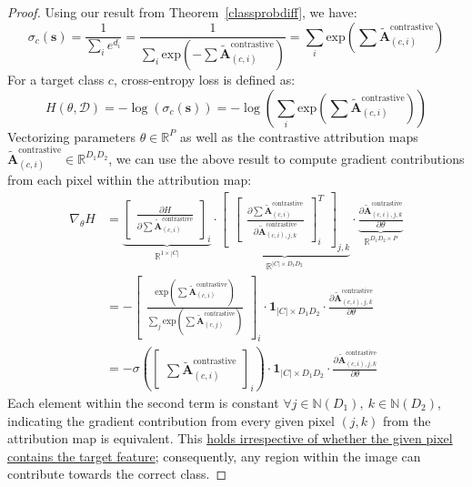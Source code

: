 \documentclass{article}
\theoremstyle{plain}
\theoremstyle{definition}
\theoremstyle{remark}
\newcommand{\contcam}[2]{\tilde{\mathcal{\bm{A}}}^{\text{contrastive}}_{(#1, #2)}}
\begin{document}
\begin{proof}
	Using our result from Theorem~\ref{classprobdiff}, we have:
	\begin{equation}
		\sigma_c(\bm{s}) = \frac{1}{\sum_i e^{d_i}} = \frac{1}{\sum_i \text{exp}({-\sum \contcam{c}{i}})} = \sum_i \text{exp}\left({\sum \contcam{c}{i}}\right)
	\end{equation}
	For a target class $c$, cross-entropy loss is defined as:
	\begin{equation}
		H(\theta, \mathcal{D}) = -\log \left( \sigma_c(\bm{s}) \right) = -\log \left( \sum_i \text{exp}\left({\sum \contcam{c}{i}}\right) \right)
	\end{equation}
	Vectorizing parameters $\theta \in \mathbb{R}^P$ as well as the contrastive attribution maps $\tilde{\mathcal{\bm{A}}}_{(c, i)}^{\text{contrastive}} \in \mathbb{R}^{D_1 D_2}$, we can use the above result to compute gradient contributions from each pixel within the attribution map:
	\begin{align}
		\nabla_\theta H &= \underbrace{\begin{bmatrix} \frac{\partial H}{\partial \sum \tilde{\mathcal{\bm{A}}}_{(c, i)}^{\text{contrastive}}} \end{bmatrix}_i}_{\mathbb{R}^{1 \times |C|}}
			\cdot \underbrace{\begin{bmatrix} \begin{bmatrix} \frac{\partial \sum \tilde{\mathcal{\bm{A}}}_{(c, i)}^{\text{contrastive}}}{\partial \tilde{\mathcal{\bm{A}}}_{(c, i), j, k}^{\text{contrastive}}} \end{bmatrix}_{i}^T \end{bmatrix}_{j,k}}_{\mathbb{R}^{|C| \times D_1 D_2}}
			\cdot \underbrace{\frac{\partial \tilde{\mathcal{\bm{A}}}_{(c, i), j, k}^{\text{contrastive}}}{\partial \theta}}_{\mathbb{R}^{D_1D_2 \times P}} \\
		&= - \begin{bmatrix} \frac{\text{exp}\left( \sum \contcam{c}{i}\right)}{\sum_j \text{exp}\left({\sum \contcam{c}{j}}\right)} \end{bmatrix}_i \cdot \bm{1}_{|C| \times D_1 D_2} \cdot \frac{\partial \tilde{\mathcal{\bm{A}}}_{(c, i), j, k}^{\text{contrastive}}}{\partial \theta} \\
			&= - \sigma\left( \begin{bmatrix} \sum \contcam{c}{i} \end{bmatrix}_i \right) \cdot \bm{1}_{|C| \times D_1 D_2} \cdot \frac{\partial \tilde{\mathcal{\bm{A}}}_{(c, i), j, k}^{\text{contrastive}}}{\partial \theta}
	\end{align}
	Each element within the second term is constant $\forall j \in \mathbb{N}(D_1),~k \in \mathbb{N}(D_2)$, indicating the gradient contribution from every given pixel $(j, k)$ from the attribution map is equivalent. This \underline{holds irrespective of whether the given pixel contains the target feature}; consequently, any region within the image can contribute towards the correct class.
\end{proof}
\end{document}

